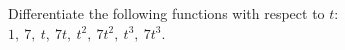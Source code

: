 Differentiate the following functions with respect to $t$:\\
 $1,\ 7,\ t,\ 7t,\ t^2,\ 7t^2,\ t^3,\ 7t^3$.
